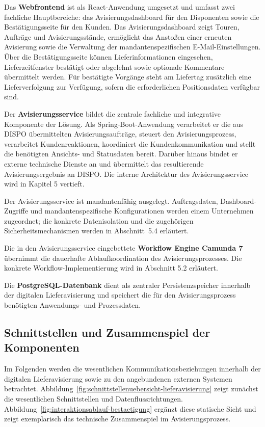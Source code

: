 Das \textbf{Webfrontend} ist als React-Anwendung umgesetzt und umfasst zwei
fachliche Hauptbereiche: das Avisierungsdashboard für den Disponenten sowie
die Bestätigungsseite für den Kunden. Das Avisierungsdashboard zeigt Touren,
Aufträge und Avisierungsstände, ermöglicht das Anstoßen einer erneuten
Avisierung sowie die Verwaltung der mandantenspezifischen
E-Mail-Einstellungen. Über die Bestätigungsseite können Lieferinformationen
eingesehen, Lieferzeitfenster bestätigt oder abgelehnt sowie optionale
Kommentare übermittelt werden. Für bestätigte Vorgänge steht am Liefertag
zusätzlich eine Lieferverfolgung zur Verfügung, sofern die erforderlichen
Positionsdaten verfügbar sind.

Der \textbf{Avisierungsservice} bildet die zentrale fachliche und integrative
Komponente der Lösung. Als Spring-Boot-Anwendung verarbeitet er die aus DISPO
übermittelten Avisierungsaufträge, steuert den Avisierungsprozess, verarbeitet
Kundenreaktionen, koordiniert die Kundenkommunikation und stellt die
benötigten Ansichts- und Statusdaten bereit. Darüber hinaus bindet er externe
technische Dienste an und übermittelt das resultierende Avisierungsergebnis an
DISPO. Die interne Architektur des Avisierungsservice wird in Kapitel 5
vertieft.

Der Avisierungsservice ist mandantenfähig ausgelegt. Auftragsdaten,
Dashboard-Zugriffe und mandantenspezifische Konfigurationen werden einem
Unternehmen zugeordnet; die konkrete Datenisolation und die zugehörigen
Sicherheitsmechanismen werden in Abschnitt~5.4 erläutert.

Die in den Avisierungsservice eingebettete \textbf{Workflow Engine Camunda 7}
übernimmt die dauerhafte Ablaufkoordination des Avisierungsprozesses. Die
konkrete Workflow-Implementierung wird in Abschnitt 5.2 erläutert.

Die \textbf{PostgreSQL-Datenbank} dient als zentraler Persistenzspeicher
innerhalb der digitalen Lieferavisierung und speichert die für den
Avisierungsprozess benötigten Anwendungs- und Prozessdaten.

\subsection{Schnittstellen und Zusammenspiel der Komponenten}
\label{sec:schnittstellen-zusammenspiel}

Im Folgenden werden die wesentlichen Kommunikationsbeziehungen innerhalb der
digitalen Lieferavisierung sowie zu den angebundenen externen Systemen
betrachtet. Abbildung~\ref{fig:schnittstellenuebersicht-lieferavisierung} zeigt
zunächst die wesentlichen Schnittstellen und Datenflussrichtungen.
Abbildung~\ref{fig:interaktionsablauf-bestaetigung} ergänzt diese statische
Sicht und zeigt exemplarisch das technische Zusammenspiel im
Avisierungsprozess.

